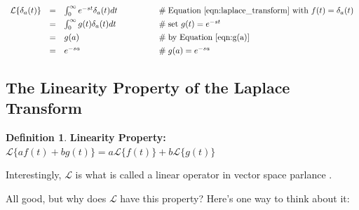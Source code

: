 \documentclass{article}
\theoremstyle{definition}
\newtheorem{definition}{Definition}[section]
\begin{document}
\bigskip
\begin{equation*}
\begin{array}{lllll}
\mathcal{L}\{\delta_a(t)\} 
&=& \int_0^\infty  e^{-st} \delta_a(t) dt    &\qquad \qquad \mathrel{\#} \text{Equation \ref{eqn:laplace_transform} with $f(t) = \delta_a(t)$}                    \\  
[4pt]                                                        %
&=& \int_0^\infty g(t) \delta_a(t) dt         &\qquad \qquad \mathrel{\#} \text{set $g(t) = e^{-st}$}                                                                                      \\
[4pt]                                                        %
&=& g(a)                                                &\qquad \qquad \mathrel{\#} \text{by Equation \ref{eqn:g(a)}}                                                                           \\
[4pt]                                                        %
&=& e^{-sa}                                            &\qquad \qquad \mathrel{\#} g(a) = e^{-sa}
\end{array}
\end{equation*}

\subsection{The Linearity Property of the Laplace Transform}
\label{subsec:linearity}


\bigskip
\begin{definition} 
{\bf Linearity Property:} $\mathcal{L}\{af (t) + bg(t)\} = a\mathcal{L}\{f(t)\} + b\mathcal{L}\{g(t)\}$
\label{def:linearity_properity}
\end{definition}

\bigskip
\noindent
Interestingly, $\mathcal{L}$ is what is called a linear operator in vector space parlance \cite{wiki:linear_map}. 

\bigskip
\noindent
All good, but why does $\mathcal{L}$ have this property? Here's one way to think about it:
\end{document}
